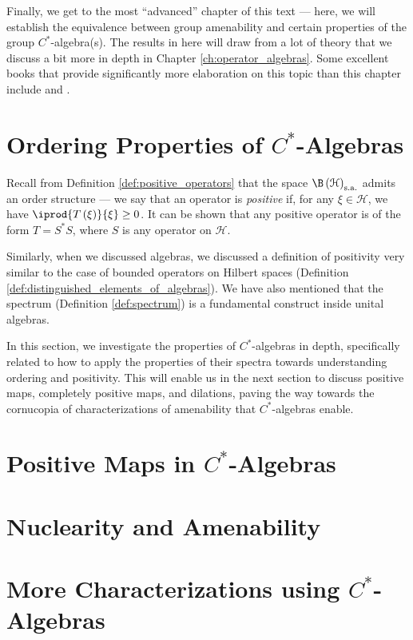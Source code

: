 Finally, we get to the most ``advanced'' chapter of this text --- here, we will establish the equivalence between group amenability and certain properties of the group $C^{\ast}$-algebra(s). The results in here will draw from a lot of theory that we discuss a bit more in depth in Chapter \ref{ch:operator_algebras}. Some excellent books that provide significantly more elaboration on this topic than this chapter include \cite{brown_and_ozawa} and \cite{completely_bounded_maps_and_operator_algebras}.
\section{Ordering Properties of $C^{\ast}$-Algebras}%
Recall from Definition \ref{def:positive_operators} that the space $\B\left( \mathcal{H} \right)_{\sa}$ admits an order structure --- we say that an operator is \textit{positive} if, for any $\xi\in \mathcal{H}$, we have $ \iprod{T\left( \xi \right)}{\xi} \geq 0 $. It can be shown that any positive operator is of the form $T = S^{\ast}S$, where $S$ is any operator on $\mathcal{H}$.\newline

Similarly, when we discussed algebras, we discussed a definition of positivity very similar to the case of bounded operators on Hilbert spaces (Definition \ref{def:distinguished_elements_of_algebras}). We have also mentioned that the spectrum (Definition \ref{def:spectrum}) is a fundamental construct inside unital algebras.\newline

In this section, we investigate the properties of $C^{\ast}$-algebras in depth, specifically related to how to apply the properties of their spectra towards understanding ordering and positivity. This will enable us in the next section to discuss positive maps, completely positive maps, and dilations, paving the way towards the cornucopia of characterizations of amenability that $C^{\ast}$-algebras enable.
\section{Positive Maps in \texorpdfstring{$C^{\ast}$-Algebras}{C*-Algebras}}%

\section{Nuclearity and Amenability}%

\section{More Characterizations using $C^{\ast}$-Algebras}%


